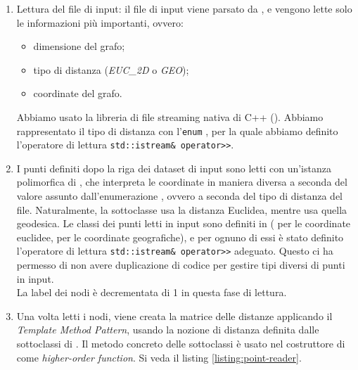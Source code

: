 \begin{enumerate}
    \item Lettura del file di input: il file di input viene parsato da , e vengono lette solo le informazioni più importanti, ovvero:

    \begin{itemize}
        \item dimensione del grafo;
        \item tipo di distanza (\textit{EUC\_2D} o \textit{GEO});
        \item coordinate del grafo.
    \end{itemize}

    \noindent Abbiamo usato la libreria di file streaming nativa di C++ (). Abbiamo rappresentato il tipo di distanza con l'\texttt{enum} , per la quale abbiamo definito l'operatore di lettura \texttt{std::istream& operator>>}.

    \item I punti definiti dopo la riga  dei dataset di input sono letti con un'istanza polimorfica di , che interpreta le coordinate in maniera diversa a seconda del valore assunto dall'enumerazione , ovvero a seconda del tipo di distanza del file. Naturalmente, la sottoclasse  usa la distanza Euclidea, mentre  usa quella geodesica. Le classi dei punti letti in input sono definiti in  ( per le coordinate euclidee,  per le coordinate geografiche), e per ognuno di essi è stato definito l'operatore di lettura \texttt{std::istream& operator>>} adeguato. Questo ci ha permesso di non avere duplicazione di codice per gestire tipi diversi di punti in input. \\

    \noindent La label dei nodi è decrementata di 1 in questa fase di lettura.

    \item Una volta letti i nodi, viene creata la matrice delle distanze applicando il \textit{Template Method Pattern}, usando la nozione di distanza definita dalle sottoclassi di . Il metodo concreto  delle sottoclassi è usato nel costruttore di  come \textit{higher-order function}. Si veda il listing \ref{listing:point-reader}.
\end{enumerate}

